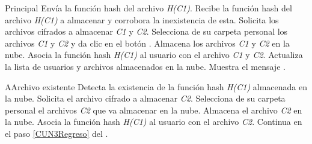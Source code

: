 \begin{UCtrayectoria}{Principal}
	\UCpaso [\UCactor] Envía la función hash del archivo \textit{H(C1)}.
	\UCpaso Recibe la función hash del archivo \textit{H(C1)} a almacenar y corrobora la inexistencia de esta. 
	\UCpaso Solicita los archivos cifrados a almacenar \textit{C1} y \textit{C2}.
	\UCpaso [\UCactor] Selecciona de su carpeta personal los archivos \textit{C1} y \textit{C2} y da clic en el botón \IUbuttonAceptar.
	\UCpaso Almacena los archivos \textit{C1} y \textit{C2} en la nube. 
	\UCpaso Asocia la función hash \textit{H(C1)} al usuario con el archivo \textit{C1} y \textit{C2}. 
	\UCpaso Actualiza la lista de usuarios y archivos almacenados en la nube. \label{CUN3Regreso}
	\UCpaso Muestra el mensaje .	
\end{UCtrayectoria}


		
\begin{UCtrayectoriaA}{A}{Archivo existente}
	\UCpaso Detecta la existencia de la función hash \textit{H(C1)} almacenada en la nube. 
	\UCpaso Solicita el archivo cifrado a almacenar \textit{C2}.
	\UCpaso [\UCactor] Selecciona de su carpeta personal el archivos \textit{C2} que va almacenar en la nube.
	\UCpaso Almacena el archivo \textit{C2} en la nube. 
	\UCpaso Asocia la función hash \textit{H(C1)} al usuario con el archivo \textit{C2}. 
	\UCpaso Continua en el paso \ref{CUN3Regreso} del .
\end{UCtrayectoriaA}

